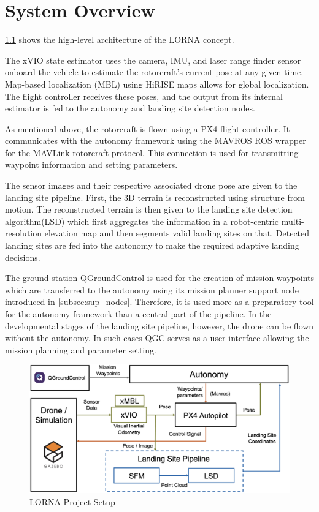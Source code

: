 \chapter{System Overview}
\label{sec:sys_overview}

\cref{fig:lorna_setup} shows the high-level architecture of the LORNA concept. 

The xVIO state estimator uses the camera, IMU, and laser range finder sensor onboard the vehicle to estimate the rotorcraft's current pose at any given time. Map-based localization (MBL) using HiRISE maps allows for global localization. The flight controller receives these poses, and the output from its internal estimator is fed to the autonomy and landing site detection nodes.

As mentioned above, the rotorcraft is flown using a PX4 flight controller. It communicates with the autonomy framework using the MAVROS ROS wrapper for the MAVLink rotorcraft protocol. This connection is used for transmitting waypoint information and setting parameters.

The sensor images and their respective associated drone pose are given to the landing site pipeline. First, the 3D terrain is reconstructed using structure from motion. The reconstructed terrain is then given to the landing site detection algorithm(LSD) which first aggregates the information in a robot-centric multi-resolution elevation map and then segments valid landing sites on that. Detected landing sites are fed into the autonomy to make the required adaptive landing decisions.

The ground station QGroundControl is used for the creation of mission waypoints which are transferred to the autonomy using its mission planner support node introduced in \cref{subsec:sup_nodes}. Therefore, it is used more as a preparatory tool for the autonomy framework than a central part of the pipeline. In the developmental stages of the landing site pipeline, however, the drone can be flown without the autonomy. In such cases QGC serves as a user interface allowing the mission planning and parameter setting. 


\clearpage %

\begin{figure}[ht]
    \centering
    \includegraphics[scale=0.18]{images/system_overview/setup_flowchart_with_vio.png}
    \caption{LORNA Project Setup}
    \label{fig:lorna_setup}
\end{figure}

